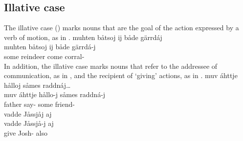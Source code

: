 \subsection{Illative case}\label{illative}
The illative case (\ILLs) marks nouns that are the goal of the action expressed by a verb of motion, as in . %
\ea\label{ill1}
\glll	muhten båtsoj ij både {gärrdáj}\\ %
	muhten båtsoj ij både gärrdá-j\\
	some reindeer\BS{}  come\BS{} corral-\\%
 
\z
In addition, the illative case marks nouns that refer to the addressee of communication, as in , and the recipient of ‘giving’ actions, as in .
\ea\label{ill2}
\glll	muv áhttje hålloj såmes {raddnáj}…\\
	muv áhttje hållo-j såmes raddná-j\\
	 father\BS{} say- some friend-\\\nopagebreak
{} 
\z
%
%
\ea\label{ill4}
\glll	vadde {Jåssjåj} aj \\
	vadde Jåssjå-j aj \\
	give\BS{} Josh- also \\%
\z

